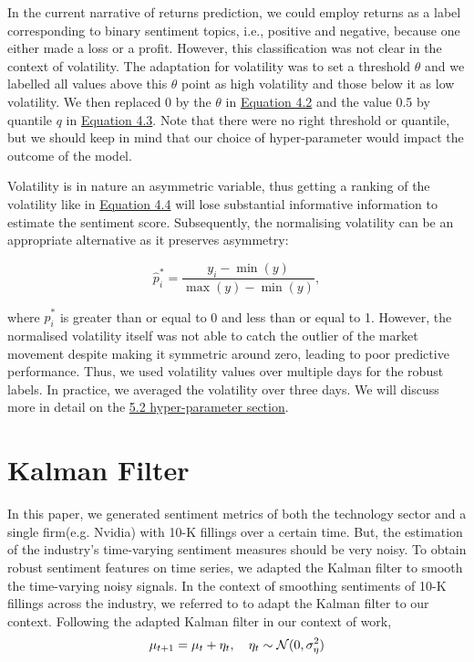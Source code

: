 \documentclass[logo,bsc,singlespacing,parskip]{infthesis}
\begin{document}
In the current narrative of returns prediction, we could employ returns as a label corresponding to binary sentiment topics, i.e., positive and negative, because one either made a loss or a profit. However, this classification was not clear in the context of volatility. The adaptation for volatility was to set a threshold $\theta$ and we labelled all values above this $\theta$ point as high volatility and those below it as low volatility. We then replaced 0 by the $\theta$ in \hyperref[4.2]{Equation 4.2} and the value 0.5 by quantile $q$ in \hyperref[4.3]{Equation 4.3}. Note that there were no right threshold or quantile, but we should keep in mind that our choice of hyper-parameter would impact the outcome of the model. 

Volatility is in nature an asymmetric variable, thus getting a ranking of the volatility like in \hyperref[4.4]{Equation 4.4}  will lose substantial informative information to estimate the sentiment score. Subsequently, the normalising volatility can be an appropriate alternative as it preserves asymmetry:

\begin{equation} \label{4.9}
\hat{p}_i^* = \frac{y_i - \min(y)}{\max(y) - \min(y)},
\end{equation}

where $\hat{p}_i^*$ is greater than or equal to 0 and less than or equal to 1. However, the normalised volatility itself was not able to catch the outlier of the market movement despite making it symmetric around zero, leading to poor predictive performance. Thus, we used volatility values over multiple days for the robust labels. In practice, we averaged the volatility over three days. We will discuss more in detail on the \hyperref[sec:hyperparameter]{5.2 hyper-parameter section}. 

\section{Kalman Filter}
In this paper, we generated sentiment metrics of both the technology sector and a single firm(e.g. Nvidia) with 10-K fillings over a certain time. But, the estimation of the industry’s time-varying sentiment measures should be very noisy. To obtain robust sentiment features on time series, we adapted the Kalman filter to smooth the time-varying noisy signals. In the context of smoothing sentiments of 10-K fillings across the industry, we referred to \cite{borovkova2017sector} to adapt the Kalman filter to our context. Following the adapted Kalman filter in our context of work, 
\begin{equation} \label{4.10}
\\\mu_{t+1} = \mu_t + \eta_t, \quad \eta_t \sim \mathcal{N}(0, \sigma_{\eta}^2)
\end{equation}
\end{document}
